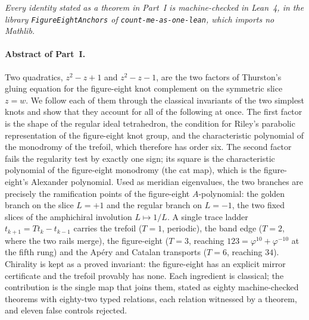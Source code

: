 \documentclass[11pt]{article}
\theoremstyle{definition}
\begin{document}
\noindent\small\textit{Every identity stated as a theorem in Part~I is machine-checked in Lean~4, in the library \texttt{FigureEightAnchors} of \texttt{count-me-as-one-lean}, which imports no Mathlib.}\normalsize

\paragraph{Abstract of Part~I.}
Two quadratics, $z^2-z+1$ and $z^2-z-1$, are the two factors of Thurston's gluing equation for the figure-eight knot complement on the symmetric slice $z=w$. We follow each of them through the classical invariants of the two simplest knots and show that they account for all of the following at once. The first factor is the shape of the regular ideal tetrahedron, the condition for Riley's parabolic representation of the figure-eight knot group, and the characteristic polynomial of the monodromy of the trefoil, which therefore has order six. The second factor fails the regularity test by exactly one sign; its square is the characteristic polynomial of the figure-eight monodromy (the cat map), which is the figure-eight's Alexander polynomial. Used as meridian eigenvalues, the two branches are precisely the ramification points of the figure-eight $A$-polynomial: the golden branch on the slice $L=+1$ and the regular branch on $L=-1$, the two fixed slices of the amphichiral involution $L\mapsto 1/L$. A single trace ladder $t_{k+1}=Tt_k-t_{k-1}$ carries the trefoil ($T=1$, periodic), the band edge ($T=2$, where the two rails merge), the figure-eight ($T=3$, reaching $123=\varphi^{10}+\varphi^{-10}$ at the fifth rung) and the Ap\'ery and Catalan transports ($T=6$, reaching $34$). Chirality is kept as a proved invariant: the figure-eight has an explicit mirror certificate and the trefoil provably has none. Each ingredient is classical; the contribution is the single map that joins them, stated as eighty machine-checked theorems with eighty-two typed relations, each relation witnessed by a theorem, and eleven false controls rejected.
\end{document}
